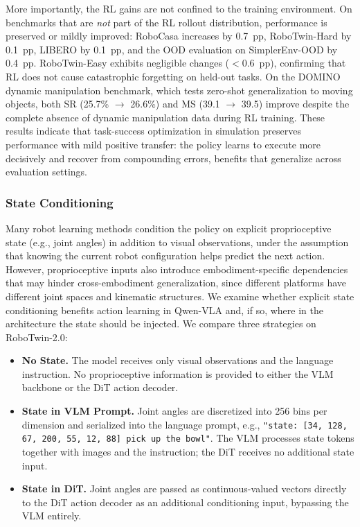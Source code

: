 \documentclass{article}
\begin{document}
More importantly, the RL gains are not confined to the training environment.
On benchmarks that are \emph{not} part of the RL rollout distribution, performance is preserved or mildly improved: RoboCasa increases by 0.7~pp, RoboTwin-Hard by 0.1~pp, LIBERO by 0.1~pp, and the OOD evaluation on SimplerEnv-OOD by 0.4~pp.
RoboTwin-Easy exhibits negligible changes ($<$0.6~pp), confirming that RL does not cause catastrophic forgetting on held-out tasks.
On the DOMINO dynamic manipulation benchmark, which tests zero-shot generalization to moving objects, both SR (25.7\% $\to$ 26.6\%) and MS (39.1 $\to$ 39.5) improve despite the complete absence of dynamic manipulation data during RL training.
These results indicate that task-success optimization in simulation preserves performance with mild positive transfer: the policy learns to execute more decisively and recover from compounding errors, benefits that generalize across evaluation settings.


\subsubsection{State Conditioning}
\label{sec:ablation_state}

Many robot learning methods condition the policy on explicit proprioceptive state (e.g., joint angles) in addition to visual observations, under the assumption that knowing the current robot configuration helps predict the next action.
However, proprioceptive inputs also introduce embodiment-specific dependencies that may hinder cross-embodiment generalization, since different platforms have different joint spaces and kinematic structures.
We examine whether explicit state conditioning benefits action learning in Qwen-VLA and, if so, where in the architecture the state should be injected.
We compare three strategies on RoboTwin-2.0:

\begin{itemize}[leftmargin=*,itemsep=2pt]
\item \textbf{No State.} The model receives only visual observations and the language instruction. No proprioceptive information is provided to either the VLM backbone or the DiT action decoder.

\item \textbf{State in VLM Prompt.} Joint angles are discretized into 256 bins per dimension and serialized into the language prompt, e.g., \texttt{"state: [34, 128, 67, 200, 55, 12, 88] pick up the bowl"}. The VLM processes state tokens together with images and the instruction; the DiT receives no additional state input.

\item \textbf{State in DiT.} Joint angles are passed as continuous-valued vectors directly to the DiT action decoder as an additional conditioning input, bypassing the VLM entirely.
\end{itemize}
\end{document}
